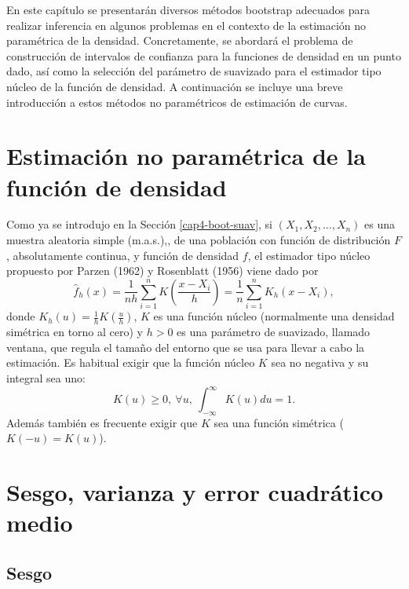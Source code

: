 \documentclass[]{book}
\theoremstyle{definition}
\theoremstyle{definition}
\theoremstyle{definition}
\theoremstyle{remark}
\begin{document}
En este capítulo se presentarán diversos métodos bootstrap adecuados
para realizar inferencia en algunos problemas en el contexto de la
estimación no paramétrica de la densidad. Concretamente, se abordará el
problema de construcción de intervalos de confianza para la funciones de
densidad en un punto dado, así como la selección del parámetro de
suavizado para el estimador tipo núcleo de la función de densidad. A
continuación se incluye una breve introducción a estos métodos no
paramétricos de estimación de curvas.

\section{Estimación no paramétrica de la función de
densidad}\label{estimacion-no-parametrica-de-la-funcion-de-densidad}

Como ya se introdujo en la Sección \ref{cap4-boot-suav}, si
\(\left( X_1, X_2, \ldots, X_n \right)\) es una muestra aleatoria simple
(m.a.s.),, de una población con función de distribución \(F\),
absolutamente continua, y función de densidad \(f\), el estimador tipo
núcleo propuesto por Parzen (1962) y Rosenblatt (1956) viene dado por
\[\hat{f}_{h}\left( x \right) =\frac{1}{nh}\sum_{i=1}^{n}K\left( \frac{x-X_i}{
h} \right) =\frac{1}{n}\sum_{i=1}^{n}K_{h}\left( x-X_i \right),\] donde
\(K_{h}\left( u \right) =\frac{1}{h}K\left( \frac{u}{h} \right)\), \(K\)
es una función núcleo (normalmente una densidad simétrica en torno al
cero) y \(h>0\) es una parámetro de suavizado, llamado ventana, que
regula el tamaño del entorno que se usa para llevar a cabo la
estimación. Es habitual exigir que la función núcleo \(K\) sea no
negativa y su integral sea uno:
\[K\left( u \right) \geq 0,~\forall u,~\int_{-\infty }^{\infty }
K\left( u \right) du=1.\] Además también es frecuente exigir que \(K\)
sea una función simétrica (\(K\left( -u \right) =K\left( u \right)\)).

\section{Sesgo, varianza y error cuadrático
medio}\label{sesgo-varianza-y-error-cuadratico-medio}

\subsection{Sesgo}\label{sesgo}
\end{document}

